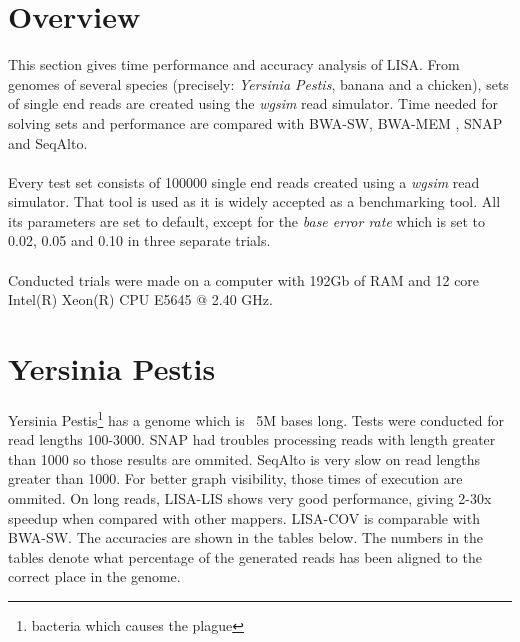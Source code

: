 \documentclass[times, utf8, diplomski]{fer}
\begin{document}
\section{Overview}
This section gives time performance and accuracy analysis of LISA. From genomes of several species (precisely: \emph{Yersinia Pestis}, banana and a chicken), sets of single end reads are created using the \emph{wgsim} read simulator. Time needed for solving sets and performance are compared with BWA-SW, BWA-MEM \cite{Li:2010:FAL:1741823.1741825}, SNAP and SeqAlto.\\
\\
Every test set consists of 100000 single end reads created using a \emph{wgsim} read simulator. That tool is used as it is widely accepted as a benchmarking tool. All its parameters are set to default, except for the \emph{base error rate} which is set to 0.02, 0.05 and 0.10 in three separate trials.\\
\\
Conducted trials were made on a computer with 192Gb of RAM and 12 core Intel(R) Xeon(R) CPU E5645 @ 2.40 GHz.


\section{Yersinia Pestis}

Yersinia Pestis\footnote{bacteria which causes the plague} has a genome which is ~5M bases long. Tests were conducted for read lengths 100-3000. SNAP had troubles processing reads with length greater than 1000 so those results are ommited. SeqAlto is very slow on read lengths greater than 1000. For better graph visibility, those times of execution are ommited. On long reads, LISA-LIS shows very good performance, giving 2-30x speedup when compared with other mappers. LISA-COV is comparable with BWA-SW. The accuracies are shown in the tables below. The numbers in the tables denote what percentage of the generated reads has been aligned to the correct place in the genome. 
\end{document}
